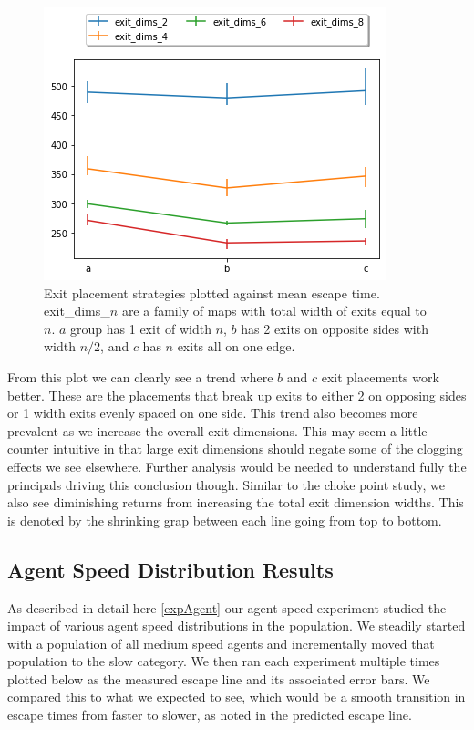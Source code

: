 \documentclass[12pt,letterpaper]{article}
\begin{document}
\begin{figure} [!ht]
  \centering
  \includegraphics[width=.75\linewidth]{./figures/exit_dims_graph.png}
  \caption{Exit placement strategies plotted against mean escape time.  exit\_dims\_$n$ are a family of maps with total width of exits equal to $n$. $a$ group has 1 exit of width $n$, $b$ has 2 exits on opposite sides with width $n/2$, and $c$ has $n$ exits all on one edge.}
  \label{fig:exitdimsResults}
\end{figure}

From this plot we can clearly see a trend where $b$ and $c$ exit placements work better.  These are the placements that break up exits to either 2 on opposing sides or 1 width exits evenly spaced on one side.  This trend also becomes more prevalent as we increase the overall exit dimensions. This may seem a little counter intuitive in that large exit dimensions should negate some of the clogging effects we see elsewhere.  Further analysis would be needed to understand fully the principals driving this conclusion though.  Similar to the choke point study, we also see diminishing returns from increasing the total exit dimension widths.  This is denoted by the shrinking grap between each line going from top to bottom.

\subsection{Agent Speed Distribution Results}

As described in detail here \ref{expAgent} our agent speed experiment studied the impact of various agent speed distributions in the population.  We steadily started with a population of all medium speed agents and incrementally moved that population to the slow category.  We then ran each experiment multiple times plotted below as the measured escape line and its associated error bars.  We compared this to what we expected to see, which would be a smooth transition in escape times from faster to slower, as noted in the predicted escape line.
\end{document}
